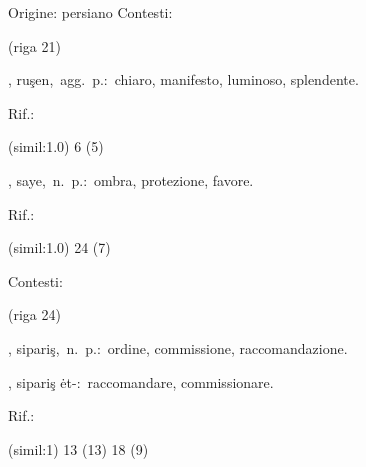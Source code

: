 \begin{glossario}{Origine: persiano}
Contesti:
\begin{subvocedue}
\item[(riga 21)] 
\end{subvocedue}
\item[{\color{colorlowref}\spzrl{rU^sin}},] {\sf ruşen},\ agg.\ p.:\ chiaro, manifesto, luminoso, splendente.
\begin{subvocedue}
\item[Rif.:] 
\end{subvocedue}
\begin{subvocedue}
\item[(simil:1.0)]   6 (5)
\end{subvocedue}
\item[{\color{colorlowref}\spzrl{sAyah}},] {\sf saye},\ n.\ p.:\ ombra, protezione, favore.
\begin{subvocedue}
\item[Rif.:] 
\end{subvocedue}
\begin{subvocedue}
\item[(simil:1.0)]   24 (7)
\end{subvocedue}


Contesti:
\begin{subvocedue}
\item[(riga 24)] 
\end{subvocedue}
\item[{\color{colorlowref}\spzrl{sipAri^s}},] {\sf sipariş},\ n.\ p.:\ ordine, commissione, raccomandazione.
\begin{subvocedue}
\item[\subglossariobullet] , {\sf sipariş ėt-}:\ raccomandare, commissionare.
\begin{subvocedue}
\item[Rif.:] 
\end{subvocedue}
\item[(simil:1)]   13 (13) 18 (9)
\end{subvocedue}



\end{glossario}
